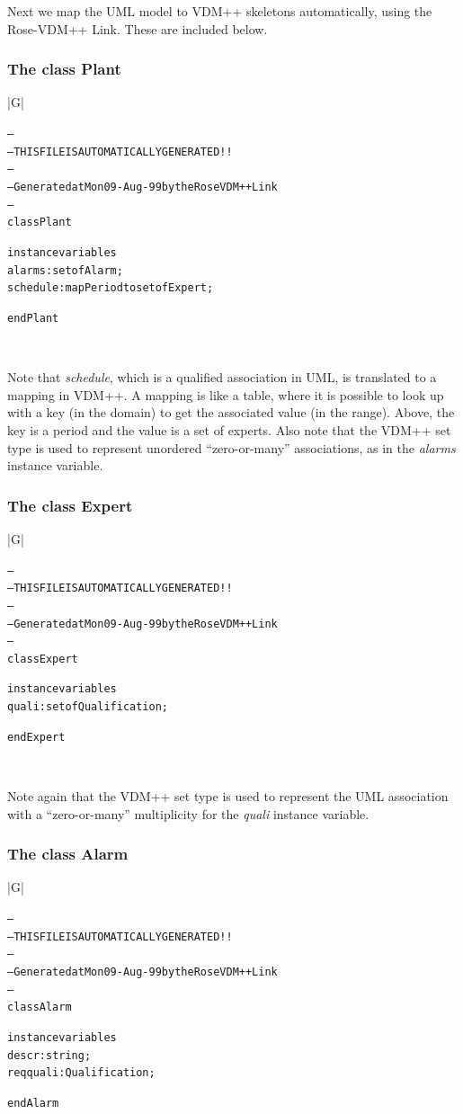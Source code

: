 \documentclass[\pformat,12pt,twoside]{article}
\newenvironment{VDMgray}%
{\begin{tabular}{|G|}\hline\small\begin{alltt}}%
{\end{alltt}\normalsize\\
 \hline\end{tabular}}
\begin{document}
Next we map the UML model to VDM++ skeletons automatically, using 
the Rose-VDM++ Link. These are included below.

\subsubsection*{The class Plant}

\begin{VDMgray}
--
-- THIS FILE IS AUTOMATICALLY GENERATED!!
--
-- Generated at Mon 09-Aug-99 by the Rose VDM++ Link
--
class Plant

instance variables
 alarms : set of Alarm;
 schedule : map Period to set of Expert;

end Plant
\end{VDMgray}

Note that \emph{schedule}, which is a qualified association in UML, 
is translated to a mapping in VDM++. A mapping is like a table, 
where it is possible to look up with a key (in the domain) to 
get the associated value (in the range). Above, the key is a 
period and the value is a set of experts. Also note that the 
VDM++ set type is used to represent unordered ``zero-or-many'' 
associations, as in the \emph{alarms} instance variable.

\subsubsection*{The class Expert}

\begin{VDMgray}
--
-- THIS FILE IS AUTOMATICALLY GENERATED!!
--
-- Generated at Mon 09-Aug-99 by the Rose VDM++ Link
--
class Expert

instance variables
 quali : set of Qualification;

end Expert
\end{VDMgray}

Note again that the VDM++ set type is used to represent the UML 
association with a ``zero-or-many'' multiplicity for the \emph{quali}
instance variable.

\subsubsection*{The class Alarm}

\begin{VDMgray}
--
-- THIS FILE IS AUTOMATICALLY GENERATED!!
--
-- Generated at Mon 09-Aug-99 by the Rose VDM++ Link
--
class Alarm

instance variables
 descr : string;
 reqquali : Qualification;

end Alarm
\end{VDMgray}
\end{document}
